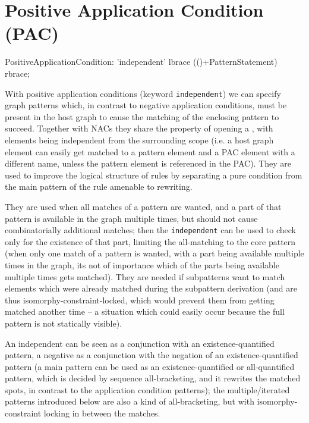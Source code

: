 

\section{Positive Application Condition (PAC)}
 \label{pac}

\begin{rail}  
  PositiveApplicationCondition: 
    'independent' lbrace (()+PatternStatement) rbrace;
\end{rail}

With positive application conditions (keyword \texttt{independent}) we can specify graph patterns which, in contrast to negative application conditions, must be present in the host graph to cause the matching of the enclosing pattern to succeed.
Together with NACs they share the property of opening a , with elements being independent from the surrounding scope (i.e. a host graph element can easily get matched to a pattern element and a PAC element with a different name, unless the pattern element is referenced in the PAC). 
They are used to improve the logical structure of rules by separating a pure condition from the main pattern of the rule amenable to rewriting.

They are used when all matches of a pattern are wanted, and a part of that pattern is available in the graph multiple times, but should not cause combinatorially additional matches; then the \texttt{independent} can be used to check only for the existence of that part, limiting the all-matching to the core pattern (when only one match of a pattern is wanted, with a part being available multiple times in the graph, its not of importance which of the parts being available multiple times gets matched).
They are needed if subpatterns want to match elements which were already matched during the subpattern derivation (and are thus isomorphy-constraint-locked, which would prevent them from getting matched another time -- a situation which could easily occur because the full pattern is not statically visible).

An independent can be seen as a conjunction with an existence-quantified pattern, a negative as a conjunction with the negation of an existence-quantified pattern (a main pattern can be used as an existence-quantified or all-quantified pattern, which is decided by sequence all-bracketing, and it rewrites the matched spots, in contrast to the application condition patterns); the multiple/iterated patterns introduced below are also a kind of all-bracketing, but with isomorphy-constraint locking in between the matches.

